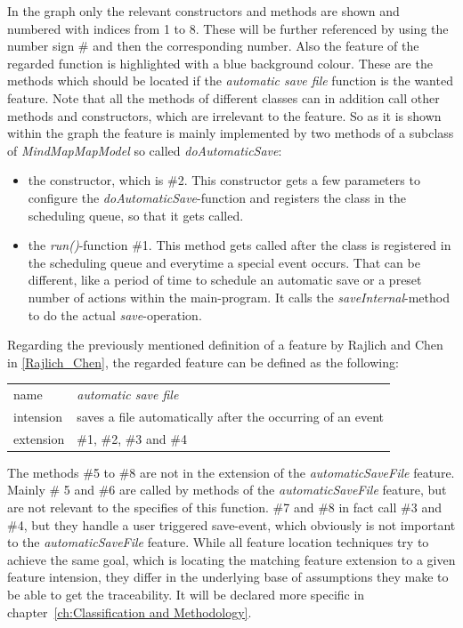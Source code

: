 In the graph only the relevant constructors and methods are shown and numbered with indices from 1 to 8. These will be further referenced by using the number sign \# and then the corresponding number. Also the feature of the regarded function is highlighted with a blue background colour. These are the methods which should be located if the \emph{automatic save file} function is the wanted feature. Note that all the methods of different classes can in addition call other methods and constructors, which are irrelevant to the feature.
So as it is shown within the graph the feature is mainly implemented by two methods of a subclass of \emph{MindMapMapModel} so called \emph{doAutomaticSave}:
\begin{itemize} 
\item the constructor, which is \#2. This constructor gets a few parameters to configure the \emph{doAutomaticSave}-function and registers the class in the scheduling queue, so that it gets called.
\item the \emph{run()}-function \#1. This method gets called after the class is registered in the scheduling queue and everytime a special event occurs. That can be different, like a period of time to schedule an automatic save or a preset number of actions within the main-program. It calls the \emph{saveInternal}-method to do the actual \textit{save}-operation.
\end{itemize}

\newpage
Regarding the previously mentioned definition of a feature by Rajlich and Chen in \autoref{Rajlich_Chen}, the regarded feature can be defined as the following: \newline
\begin{tabular}{ l  l }
  name & \emph{automatic save file}  \\
  intension & saves a file automatically after the occurring of an event\\
 extension & \#1,  \#2, \#3 and \#4\\
\end{tabular} \newline
The methods \#5 to \#8 are not in the extension of the \emph{automaticSaveFile} feature.
Mainly \# 5 and \#6 are called by methods of the \emph{automaticSaveFile} feature, but are not relevant to the specifies of this function.
\#7 and \#8 in fact call \#3 and \#4, but they handle a user triggered save-event, which obviously is not important to the \emph{automaticSaveFile} feature.
\newline \newline
While all feature location techniques try to achieve the same goal, which is locating the matching feature extension to a given feature intension, they differ in the underlying base of assumptions they make to be able to get the traceability. It will be declared more specific in chapter~\ref{ch:Classification and Methodology}. 

